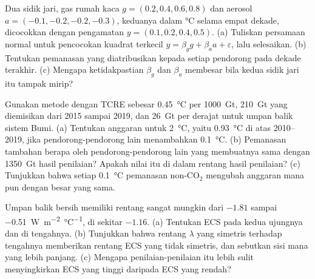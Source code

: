 \begin{exercise}[$\star\star\star$]\label{exo:b2:anthropogenic-climate-change:10}
Dua sidik jari, gas rumah kaca $g = (0.2, 0.4, 0.6, 0.8)$ dan aerosol $a = (-0.1, -0.2,
-0.2, -0.3)$, keduanya dalam \unit{\celsius} selama empat dekade, dicocokkan dengan pengamatan $y = (0.1,
0.2, 0.4, 0.5)$. (a) Tuliskan persamaan normal untuk pencocokan kuadrat terkecil $y = \beta_g g + \beta_a a
+ \varepsilon$, lalu selesaikan. (b) Tentukan pemanasan yang diatribusikan kepada setiap pendorong pada dekade terakhir.
(c) Mengapa ketidakpastian $\beta_g$ dan $\beta_a$ membesar bila kedua sidik jari itu tampak mirip?
\end{exercise}

\begin{exercise}[$\star\star\star$]\label{exo:b2:anthropogenic-climate-change:11}
Gunakan metode  dengan TCRE sebesar \qty{0.45}{\celsius} per
\qty{1000}{Gt}, \qty{210}{Gt} yang diemisikan dari 2015 sampai 2019, dan \qty{26}{Gt} per derajat untuk
umpan balik sistem Bumi. (a) Tentukan anggaran untuk \qty{2}{\celsius}, yaitu \qty{0.93}{\celsius} di atas
2010--2019, jika pendorong-pendorong lain menambahkan \qty{0.1}{\celsius}. (b) Pemanasan tambahan berapa oleh pendorong-pendorong
lain yang membuatnya sama dengan \qty{1350}{Gt} hasil penilaian? Apakah nilai itu di dalam rentang hasil penilaian? (c) Tunjukkan
bahwa setiap \qty{0.1}{\celsius} pemanasan non-CO$_2$ mengubah anggaran mana pun dengan besar yang sama.
\end{exercise}

\begin{exercise}[$\star\star\star$]\label{exo:b2:anthropogenic-climate-change:12}
Umpan balik bersih memiliki rentang sangat mungkin dari $-1.81$ sampai \qty{-0.51}{W.m^{-2}.\celsius^{-1}}, di sekitar
$-1.16$. (a) Tentukan ECS pada kedua ujungnya dan di tengahnya. (b) Tunjukkan bahwa rentang $\lambda$ yang
simetris terhadap tengahnya memberikan rentang ECS yang tidak simetris, dan sebutkan sisi mana yang lebih panjang. (c) Mengapa
penilaian-penilaian itu lebih sulit menyingkirkan ECS yang tinggi daripada ECS yang rendah?
\end{exercise}

